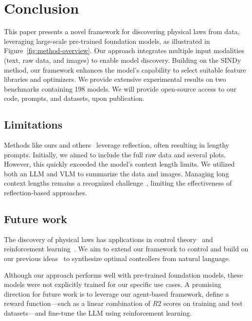 \documentclass{article}
\begin{document}
\section{Conclusion}

This paper presents a novel framework for discovering physical laws from data, leveraging large-scale pre-trained foundation models, as illustrated in Figure~\ref{fig:method-overview}. 
Our approach integrates multiple input modalities (text, raw data, and images) to enable model discovery. 
Building on the SINDy method, our framework enhances the model's capability to select suitable feature libraries and optimizers. 
We provide extensive experimental results on two benchmarks containing 198 models. 
We will provide open-source access to our code, prompts, and datasets, upon publication.

\subsection{Limitations}

Methods like ours and others~\cite{Mengge24, ma2024dreureka} leverage reflection, often resulting in lengthy prompts. 
Initially, we aimed to include the full raw data and several plots. 
However, this quickly exceeded the model's context length limits. 
We utilized both an LLM and VLM to summarize the data and images. 
Managing long context lengths remains a recognized challenge~\cite{fountas2024}, limiting the effectiveness of reflection-based approaches.

\subsection{Future work}

The discovery of physical laws has applications in control theory~\cite{Brunton16b, sahoo2018learning, kaiser2018sparse} and reinforcement learning~\cite{arora2022modelbased, zolman2024sindyrlinterpretableefficientmodelbased}. 
We aim to extend our framework to control and build on our previous ideas~\cite{mower2024optimal} to synthesize optimal controllers from natural language.

Although our approach performs well with pre-trained foundation models, these models were not explicitly trained for our specific use cases. 
A promising direction for future work is to leverage our agent-based framework, define a reward function—such as a linear combination of $R2$ scores on training and test datasets—and fine-tune the LLM using reinforcement learning.
\end{document}
